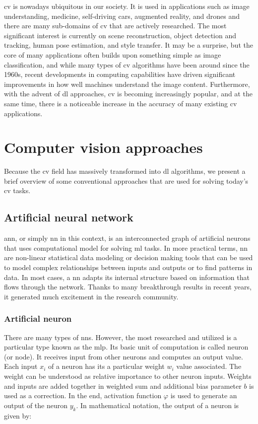         \Gls{cv} is nowadays ubiquitous in our society. It is used in applications such as image understanding, medicine, self-driving cars, augmented reality, and drones and there are many sub-domains of \gls{cv} that are actively researched. The most significant interest is currently on scene reconstruction, object detection and tracking, human pose estimation, and style transfer. It may be a surprise, but the core of many applications often builds upon something simple as image classification, and while many types of \gls{cv} algorithms have been around since the 1960s, recent developments in computing capabilities have driven significant improvements in how well machines understand the image content. Furthermore, with the advent of \gls{dl} approaches, \gls{cv} is becoming increasingly popular, and at the same time, there is a noticeable increase in the accuracy of many existing \gls{cv} applications. 
     
\section{Computer vision approaches}
    Because the \gls{cv} field has massively transformed into \gls{dl} algorithms, we present a brief overview of some conventional approaches that are used for solving today's \gls{cv} tasks.
    
    \subsection{Artificial neural network}
        \Gls{ann}, or simply \gls{nn} in this context, is an interconnected graph of artificial neurons that uses computational model for solving \gls{ml} tasks. In more practical terms, \gls{nn} are non-linear statistical data modeling or decision making tools that can be used to model complex relationships between inputs and outputs or to find patterns in data. In most cases, a \gls{nn} adapts its internal structure based on information that flows through the network. Thanks to many breakthrough results in recent years, it generated much excitement in the research community. 
        
        \subsubsection{Artificial neuron}
            There are many types of \gls{nn}s. However, the most researched and utilized is a particular type known as the \gls{mlp}. Its basic unit of computation is called neuron (or node). It receives input from other neurons and computes an output value. Each input $x_i$ of a neuron has its a particular weight $w_i$ value associated. The weight can be understood as relative importance to other neuron inputs. Weights and inputs are added together in weighted sum and additional bias parameter $b$ is used as a correction. In the end, activation function $\varphi$ is used to generate an output of the neuron $y_k$.  In mathematical notation, the output of a neuron is given by:
    
